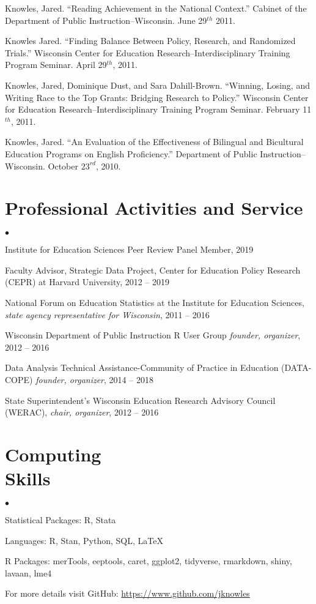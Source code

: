\documentclass[margin,line]{res}
\newenvironment{list2}{
  \begin{list}{$\bullet$}{%
      \setlength{\itemsep}{0in}
      \setlength{\parsep}{0in} \setlength{\parskip}{0in}
      \setlength{\topsep}{0in} \setlength{\partopsep}{0in} 
      \setlength{\leftmargin}{0.2in}}}{\end{list}}
\begin{document}
\begin{resume}
Knowles, Jared. ``Reading Achievement in the National Context.'' Cabinet of the Department of Public Instruction--Wisconsin. June 29$^{th}$ 2011.

Knowles Jared. ``Finding Balance Between Policy, Research, and Randomized Trials.'' Wisconsin Center for Education Research--Interdisciplinary Training Program Seminar. April 29$^{th}$, 2011.

Knowles, Jared, Dominique Dust, and Sara Dahill-Brown. ``Winning, Losing, and Writing Race to the Top Grants: Bridging Research to Policy.'' Wisconsin Center for Education Research--Interdisciplinary Training Program Seminar. February 11$^{th}$, 2011.

Knowles, Jared. ``An Evaluation of the Effectiveness of Bilingual and Bicultural Education Programs on English Proficiency.'' Department of Public Instruction--Wisconsin. October $23^{rd}$, 2010. 

\section{\sc Professional Activities and Service}
% 
\begin{list2}
\item Institute for Education Sciences Peer Review Panel Member, 2019
\item Faculty Advisor, Strategic Data Project, Center for Education Policy Research (CEPR) at Harvard University, 2012 -- 2019
\item National Forum on Education Statistics at the Institute for Education Sciences, \emph{state agency representative for Wisconsin}, 2011 -- 2016
\item Wisconsin Department of Public Instruction R User Group \emph{founder, organizer}, 
2012 -- 2016 
\item Data Analysis Technical Assistance-Community of Practice in Education 
(DATA-COPE) \emph{founder, organizer}, 2014 -- 2018
\item State Superintendent's Wisconsin Education Research Advisory Council (WERAC), 
\emph{chair, organizer}, 2012 -- 2016
\end{list2}
 
\section{\sc Computing \\ Skills} 
\begin{list2}
\item Statistical Packages: R, Stata
\item Languages:  R, Stan, Python, SQL, \LaTeX
\item R Packages: merTools, eeptools, caret, 
ggplot2, tidyverse, rmarkdown, shiny, lavaan, lme4
\item For more details visit GitHub: \url{https://www.github.com/jknowles}\\
\end{list2}


\end{resume}
\end{document}
